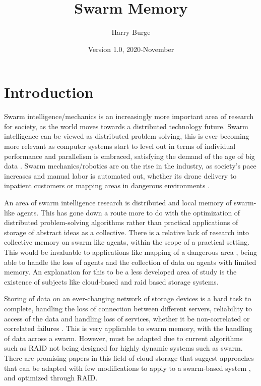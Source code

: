 \documentclass{UoYCSproject}
\author{Harry Burge}
\title{Swarm Memory}
\date{Version 1.0, 2020-November}
\begin{document}
\maketitle
\listoffigures
\listoftables



\begin{summary}

\end{summary}


\chapter{Introduction}
\label{cha:Introduction}

Swarm intelligence/mechanics is an increasingly more important area of research for society, as the world moves towards a distributed technology future.
Swarm intelligence can be viewed as distributed problem solving\cite{Cognitive maps mine detection, Swarm intellegiegence}, this is ever becoming more relevant as computer systems start to level out in terms of individual performance \cite{CPU speed} and parallelism is embraced, satisfying the demand of the age of big data \cite{Avalability storage}.
Swarm mechanics/robotics are on the rise in the industry, as society's pace increases and manual labor is automated out, whether its drone delivery to inpatient customers or mapping areas in dangerous environments \cite{Swarm robotics reviewed}.

An area of swarm intelligence research is distributed and local memory of swarm-like agents.
This has gone down a route more to do with the optimization of distributed problem-solving algorithms rather than practical applications of storage of abstract ideas as a collective.
There is a relative lack of research into collective memory on swarm like agents, within the scope of a practical setting.
This would be invaluable to applications like mapping of a dangerous area \cite{Cognitive maps mine detection}, being able to handle the loss of agents and the collection of data on agents with limited memory.
An explanation for this to be a less developed area of study is the existence of subjects like cloud-based and raid based storage systems.

Storing of data on an ever-changing network of storage devices is a hard task to complete, handling the loss of connection between different servers, reliability to access of the data and handling loss of services, whether it be non-correlated or correlated failures \cite{Avalability storage}.
This is very applicable to swarm memory, with the handling of data across a swarm. However, must be adapted due to current algorithms such as RAID not being designed for highly dynamic systems such as swarm.
There are promising papers in this field of cloud storage that suggest approaches that can be adapted with few modifications to apply to a swarm-based system \cite{Distributed Storage}, and optimized through RAID.
\end{document}
